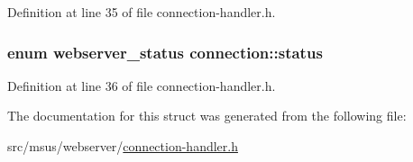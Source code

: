 Definition at line 35 of file connection-\/handler.\-h.

\hypertarget{structconnection_a70afd7d3c892d86014a13a5af6ce65e1}{
\subsubsection[{status}]{\setlength{\rightskip}{0pt plus 5cm}enum {\bf webserver\-\_\-status} connection\-::status}}\label{structconnection_a70afd7d3c892d86014a13a5af6ce65e1}


Definition at line 36 of file connection-\/handler.\-h.



The documentation for this struct was generated from the following file\-:\begin{DoxyCompactItemize}
\item 
src/msus/webserver/\hyperlink{connection-handler_8h}{connection-\/handler.\-h}\end{DoxyCompactItemize}
